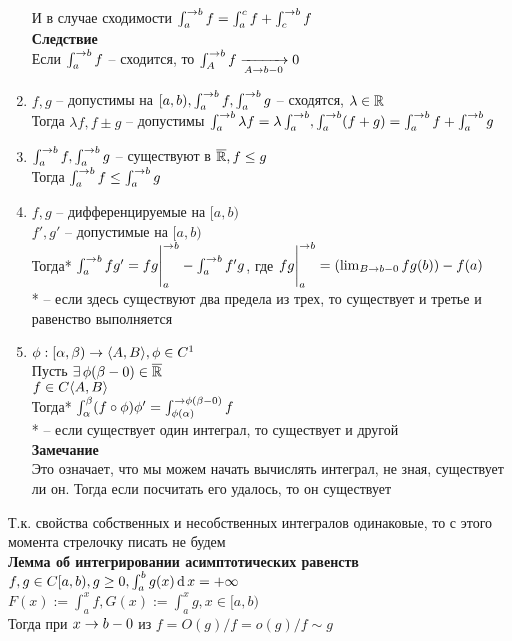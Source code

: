 \documentclass[12pt]{article}
\begin{document}
\begin{enumerate}
     И в случае сходимости $\int_a^{\rightarrow b} f = \int_a^c f + \int_c^{\rightarrow b} f$\\
     \textbf{Следствие}\\
     Если $\int_a^{\rightarrow b}f$ -- сходится, то $\int_A^{\rightarrow b}f \xrightarrow[A\rightarrow b-0]{} 0$
     \item $f, g$ -- допустимы на $[a, b), \int_a^{\rightarrow b} f, \int_a^{\rightarrow b} g$ -- сходятся, $\lambda \in \mathbb{R}$\\
     Тогда $\lambda f, f\pm g$ -- допустимы $\int_a^{\rightarrow b} \lambda f = \lambda\int_a^{\rightarrow b}, \int_a^{\rightarrow b} (f + g) = \int_a^{\rightarrow b}f + \int_a^{\rightarrow b} g$
     \item $\int_a^{\rightarrow b} f, \int_a^{\rightarrow b} g$ -- существуют в $\overline{\mathbb{R}}, f \leq g$\\
     Тогда $\int_a^{\rightarrow b} f \leq \int_a^{\rightarrow b} g$
     \item $f, g$ -- дифференцируемые на $[a,b)$\\
     $f', g'$ -- допустимые на $[a,b)$\\
     Тогда* $\int_a^{\rightarrow b} fg' = fg\Biggr|_a^{\rightarrow b}-\int_a^{\rightarrow b} f'g$, где $fg\Biggr|_a^{\rightarrow b} = (\lim_{B \rightarrow b-0} fg(b)) - f(a)$\\
     * -- если здесь существуют два предела из трех, то существует и третье и равенство выполняется
     \item $\phi: [\alpha, \beta) \rightarrow \langle A, B \rangle, \phi \in C^1$\\
     Пусть $\exists\, \phi(\beta-0) \in \overline{\mathbb{R}}$\\
    $f \in C\langle A, B \rangle$\\
    Тогда* $\int_\alpha^\beta (f \circ \phi) \phi' = \int_{\phi(\alpha)}^{\rightarrow \phi(\beta-0)} f$\\
    * -- если существует один интеграл, то существует и другой\\
    \textbf{Замечание}\\
    Это означает, что мы можем начать вычислять интеграл, не зная, существует ли он. Тогда если посчитать его удалось, то он существует
\end{enumerate}
Т.к. свойства собственных и несобственных интегралов одинаковые, то с этого момента стрелочку писать не будем\\
\textbf{Лемма об интегрировании асимптотических равенств}\\
$f, g \in C[a,b), g \geq 0, \int_a^b g(x)\operatorname{d} x = +\infty$\\
$F(x):= \int_a^x f, G(x) := \int_a^x g, x\in [a,b)$\\
Тогда при $x\rightarrow b-0$ из $f=O(g) / f=o(g) / f \sim g$\\
\end{document}
